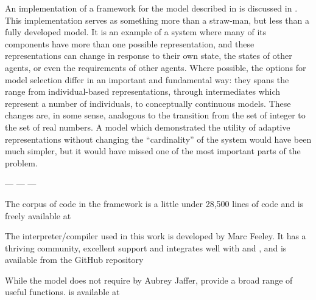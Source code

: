 An implementation of a framework for the model described in \Cthree is
discussed in \Cfive.  This implementation serves as something more
than a straw-man, but less than a fully developed model.  It is an
example of a system where many of its components have more than one
possible representation, and these representations can change in
response to their own state, the states of other agents, or even the
requirements of other agents.  Where possible, the options for model
selection differ in an important and fundamental way: they spans the
range from individual-based representations, through intermediates
which represent a number of individuals, to conceptually continuous
models. These changes are, in some sense, analogous to the transition
from the set of integer to the set of real numbers.  A model which
demonstrated the utility of adaptive representations without changing
the ``cardinality'' of the system would have been much simpler, but it
would have missed one of the most important parts of the problem.

\begin{center}
--- --- ---
\end{center}

The corpus of code in the framework is a little under 28,500 lines of
\Scheme code and is freely available at\\
\makebox[\textwidth]{\repos}

The interpreter/compiler used in this work is \Gambit developed by
Marc Feeley.  It has a thriving community, excellent support and
integrates well with \CC and \Cpp, and is available from the GitHub
repository\\

While the model does not require \SLIB by Aubrey Jaffer, \SLIB
provide a broad range of useful functions. \SLIB is available at\\



